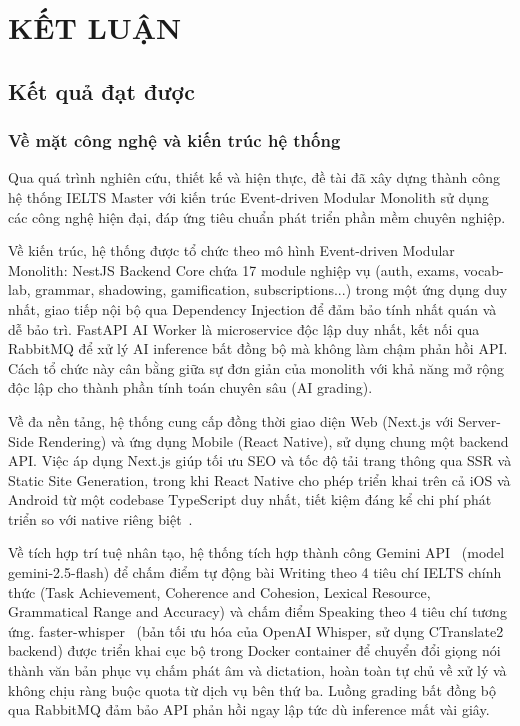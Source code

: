 \chapter{KẾT LUẬN}

\section{Kết quả đạt được}

\subsection{Về mặt công nghệ và kiến trúc hệ thống}

Qua quá trình nghiên cứu, thiết kế và hiện thực, đề tài đã xây dựng thành công hệ thống IELTS Master với kiến trúc Event-driven Modular Monolith sử dụng các công nghệ hiện đại, đáp ứng tiêu chuẩn phát triển phần mềm chuyên nghiệp.

Về kiến trúc, hệ thống được tổ chức theo mô hình Event-driven Modular Monolith: NestJS Backend Core chứa 17 module nghiệp vụ (auth, exams, vocab-lab, grammar, shadowing, gamification, subscriptions...) trong một ứng dụng duy nhất, giao tiếp nội bộ qua Dependency Injection để đảm bảo tính nhất quán và dễ bảo trì. FastAPI AI Worker là microservice độc lập duy nhất, kết nối qua RabbitMQ để xử lý AI inference bất đồng bộ mà không làm chậm phản hồi API. Cách tổ chức này cân bằng giữa sự đơn giản của monolith với khả năng mở rộng độc lập cho thành phần tính toán chuyên sâu (AI grading).

Về đa nền tảng, hệ thống cung cấp đồng thời giao diện Web (Next.js với Server-Side Rendering) và ứng dụng Mobile (React Native), sử dụng chung một backend API. Việc áp dụng Next.js giúp tối ưu SEO và tốc độ tải trang thông qua SSR và Static Site Generation, trong khi React Native cho phép triển khai trên cả iOS và Android từ một codebase TypeScript duy nhất, tiết kiệm đáng kể chi phí phát triển so với native riêng biệt~\cite{reactnative-docs}.

Về tích hợp trí tuệ nhân tạo, hệ thống tích hợp thành công Gemini API~\cite{gemini-api} (model gemini-2.5-flash) để chấm điểm tự động bài Writing theo 4 tiêu chí IELTS chính thức (Task Achievement, Coherence and Cohesion, Lexical Resource, Grammatical Range and Accuracy) và chấm điểm Speaking theo 4 tiêu chí tương ứng. faster-whisper~\cite{whisper-paper} (bản tối ưu hóa của OpenAI Whisper, sử dụng CTranslate2 backend) được triển khai cục bộ trong Docker container để chuyển đổi giọng nói thành văn bản phục vụ chấm phát âm và dictation, hoàn toàn tự chủ về xử lý và không chịu ràng buộc quota từ dịch vụ bên thứ ba. Luồng grading bất đồng bộ qua RabbitMQ đảm bảo API phản hồi ngay lập tức dù inference mất vài giây.

